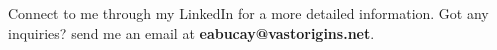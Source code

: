 
\begin{cvinterests}
    {Connect to me through my LinkedIn for a more detailed information. Got any inquiries? send me an email at \textbf{eabucay@vastorigins.net}.}
\end{cvinterests}